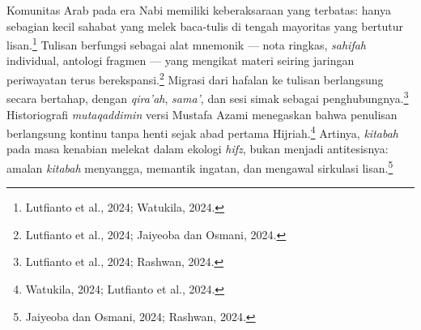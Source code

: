 Komunitas Arab pada era Nabi memiliki keberaksaraan yang terbatas: hanya sebagian kecil sahabat yang melek baca-tulis di tengah mayoritas yang bertutur lisan.\footnote{Lutfianto et al., 2024; Watukila, 2024.} Tulisan berfungsi sebagai alat mnemonik --- nota ringkas, \textit{sahifah} individual, antologi fragmen --- yang mengikat materi seiring jaringan periwayatan terus berekspansi.\footnote{Lutfianto et al., 2024; Jaiyeoba dan Osmani, 2024.} Migrasi dari hafalan ke tulisan berlangsung secara bertahap, dengan \textit{qira'ah}, \textit{sama'}, dan sesi simak sebagai penghubungnya.\footnote{Lutfianto et al., 2024; Rashwan, 2024.} Historiografi \textit{mutaqaddimin} versi Mustafa Azami menegaskan bahwa penulisan berlangsung kontinu tanpa henti sejak abad pertama Hijriah.\footnote{Watukila, 2024; Lutfianto et al., 2024.} Artinya, \textit{kitabah} pada masa kenabian melekat dalam ekologi \textit{hifz}, bukan menjadi antitesisnya: amalan \textit{kitabah} menyangga, memantik ingatan, dan mengawal sirkulasi lisan.\footnote{Jaiyeoba dan Osmani, 2024; Rashwan, 2024.}

